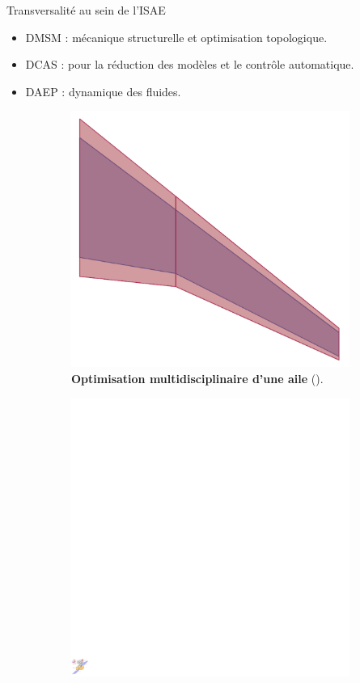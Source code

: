 \documentclass[aspectratio=169, french]{beamer}
\begin{document}
\begin{frame}{Transversalité au sein de l'ISAE}
\begin{itemize}
	\item DMSM : mécanique structurelle et optimisation topologique. 
	\item DCAS : pour la réduction des modèles et le contrôle automatique.
	\item DAEP : dynamique des fluides.
\end{itemize}
\begin{figure}[t]
	\begin{subfigure}{0.45\textwidth}
		\includegraphics[height=.45\textheight]{MDO_wing.pdf}%
		\caption*{\textbf{Optimisation multidisciplinaire d'une aile} (\cite {masColomer2021mdo}). }
	\end{subfigure}\hfill
	\begin{subfigure}{0.5\textwidth}
		\includegraphics[height=.45\textheight]{Codesign_satellite.pdf} 

\end{subfigure}
\end{figure}
\end{frame}
\end{document}
